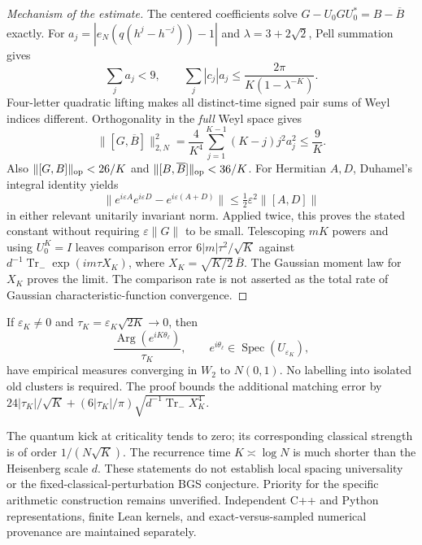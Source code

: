 \begin{proof}[Mechanism of the estimate]
The centered coefficients solve $G-U_0GU_0^*=B-\overline B$ exactly.
For $a_j=|e_N(q(h^j-h^{-j}))-1|$ and $\lambda=3+2\sqrt2$, Pell summation gives
\[
 \sum_j a_j<9,\qquad
 \sum_j|c_j|a_j\leq\frac{2\pi}{K(1-\lambda^{-K})}.
\]
Four-letter quadratic lifting makes all distinct-time signed pair sums
of Weyl indices different. Orthogonality in the \emph{full} Weyl space gives
\[
 \|[G,\overline B]\|_{2,N}^2
   =\frac4{K^4}\sum_{j=1}^{K-1}(K-j)j^2a_j^2\leq\frac9K.
\]
Also $\|[G,B]\|_{\rm op}<26/K$ and
$\|[B,\overline B]\|_{\rm op}<36/K$.
For Hermitian $A,D$, Duhamel's integral identity yields
\[
 \|e^{i\varepsilon A}e^{i\varepsilon D}
             -e^{i\varepsilon(A+D)}\|
 \leq\tfrac12\varepsilon^2\|[A,D]\|
\]
in either relevant unitarily invariant norm. Applied twice, this proves
the stated constant without requiring $\varepsilon\|G\|$ to be small.
Telescoping $mK$ powers and using $U_0^K=I$ leaves comparison error
$6|m|\tau^2/\sqrt K$ against
$d^{-1}\operatorname{Tr}_{-}\exp(im\tau X_K)$,
where $X_K=\sqrt{K/2}\,\overline B$. The Gaussian moment law for $X_K$
proves the limit. The comparison rate is not asserted as the total rate
of Gaussian characteristic-function convergence.
\end{proof}

\begin{corollary}
If $\varepsilon_K\ne0$ and $\tau_K=\varepsilon_K\sqrt{2K}\to0$, then
\[
 \frac{\operatorname{Arg}(e^{iK\theta_\ell})}{\tau_K},
 \qquad e^{i\theta_\ell}\in\operatorname{Spec}(U_{\varepsilon_K}),
\]
have empirical measures converging in $W_2$ to $N(0,1)$.
No labelling into isolated old clusters is required. The proof bounds the
additional matching error by
$24|\tau_K|/\sqrt K+(6|\tau_K|/\pi)\sqrt{d^{-1}\operatorname{Tr}_{-}X_K^4}$.
\end{corollary}

The quantum kick at criticality tends to zero; its corresponding classical
strength is of order $1/(N\sqrt K)$. The recurrence time $K\asymp\log N$
is much shorter than the Heisenberg scale $d$. These statements do not
establish local spacing universality or the fixed-classical-perturbation
BGS conjecture. Priority for the specific arithmetic construction remains
unverified. Independent C++ and Python representations, finite Lean kernels,
and exact-versus-sampled numerical provenance are maintained separately.


